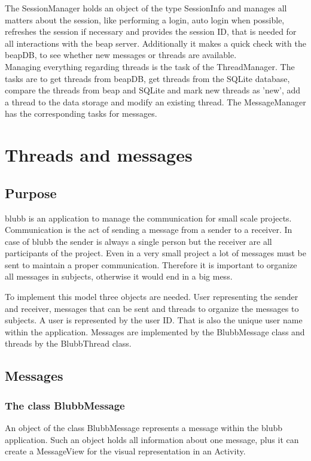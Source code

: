\documentclass[12pt,a4paper,oneside]{report}
\newcommand{\appname}{blubb}
\newcommand{\beapDB}{beapDB}
\newcommand{\beapServer}{beap server}
\begin{document}
The SessionManager holds an object of the type SessionInfo and manages all matters about the session, like performing a login, auto login when possible, refreshes the session if necessary and provides the session ID, that is needed for all interactions with the \beapServer{}. Additionally it makes a quick check with the \beapDB{}, to see whether new messages or threads are available.\\

Managing everything regarding threads is the task of the ThreadManager. The tasks are to get threads from \beapDB{}, get threads from the SQLite database, compare the threads from beap and SQLite and mark new threads as 'new', add a thread to the data storage and modify an existing thread. 
The MessageManager has the corresponding tasks for messages. 
\section{Threads and messages}
\subsection{Purpose}
\appname{} is an application to manage the communication for small scale projects. Communication is the act of sending a message from a sender to a receiver. In case of \appname{} the sender is always a single person but the receiver are all participants of the project. Even in a very small project a lot of messages must be sent to maintain a proper communication. Therefore it is important to organize all messages in subjects, otherwise it would end in a big mess.


To implement this model three objects are needed. User representing the sender and receiver, messages that can be sent and threads to organize the messages to subjects. A user is represented by the user ID. That is also the unique user name within the application. Messages are implemented by the BlubbMessage class and threads by the BlubbThread class.

\subsection{Messages}
\subsubsection{The class BlubbMessage}
An object of the class BlubbMessage represents a message within the \appname{} application. Such an object holds all information about one message, plus it can create a MessageView for the visual representation in an Activity. 
\end{document}
